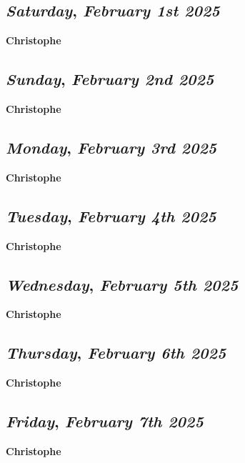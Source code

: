 \begin{center}
\section*{\month}
\end{center}

\def\day{\textit{February 1st 2025}}
\def\weekday{\textit{Saturday}}
\subsection*{\weekday, \day}
\textbf {Christophe}

\def\day{\textit{February 2nd 2025}}
\def\weekday{\textit{Sunday}}
\subsection*{\weekday, \day}
\textbf {Christophe}

\def\day{\textit{February 3rd 2025}}
\def\weekday{\textit{Monday}}
\subsection*{\weekday, \day}
\textbf {Christophe}

\def\day{\textit{February 4th 2025}}
\def\weekday{\textit{Tuesday}}
\subsection*{\weekday, \day}
\textbf {Christophe}

\def\day{\textit{February 5th 2025}}
\def\weekday{\textit{Wednesday}}
\subsection*{\weekday, \day}
\textbf {Christophe}

\def\day{\textit{February 6th 2025}}
\def\weekday{\textit{Thursday}}
\subsection*{\weekday, \day}
\textbf {Christophe}

\def\day{\textit{February 7th 2025}}
\def\weekday{\textit{Friday}}
\subsection*{\weekday, \day}
\textbf {Christophe}

\def\day{\textit{February 8th 2025}}
\def\weekday{\textit{Saturday}}
